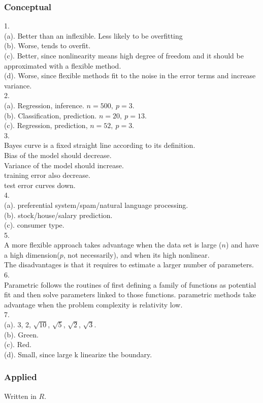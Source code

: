 \subsubsection*{Conceptual}
1. \\
(a). Better than an inflexible. Less likely to be overfitting \\
(b). Worse, tends to overfit. \\
(c).  Better, since nonlinearity means high degree of freedom and it should be approximated with a flexible method.  \\
(d).  Worse, since flexible methods fit to the noise in the error terms and increase variance. \\
2. \\
(a). Regression, inference. $n = 500,\ p = 3$. \\
(b). Classification, prediction. $n = 20,\ p = 13$. \\
(c). Regression, prediction, $n = 52,\ p = 3$. \\
3. \\
Bayes curve is a fixed straight line according to its definition. \\
Bias of the model should decrease. \\
Variance of the model should increase. \\
training error also decrease. \\
test error curves down. \\
4.\\
(a). preferential system/spam/natural language processing. \\
(b). stock/house/salary prediction. \\
(c). consumer type. \\
5. \\
A more flexible approach takes advantage when the data set is large ($n$) and have a high dimension($p$, not necessarily), and when its high nonlinear. \\
The disadvantages is that it requires to estimate a larger number of parameters.\\
6. \\
Parametric follows the routines of first defining a family of functions as potential fit and then solve parameters linked to those functions. parametric methods take advantage when the problem complexity is relativity low.\\
7. \\
(a). 3, 2, $\sqrt{10}$, $\sqrt{5}$, $\sqrt{2}$, $\sqrt{3}$. \\
(b). Green. \\
(c). Red. \\
(d). Small, since large k linearize the boundary.
\subsubsection*{Applied}
Written in $R$.





